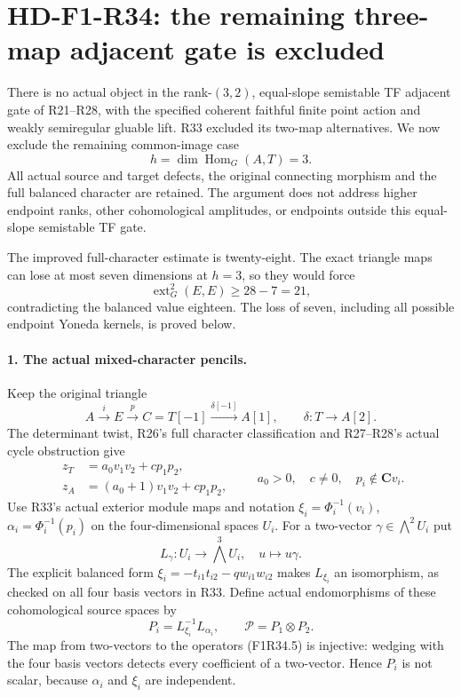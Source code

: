 \section[HD-F1-R34: the rank-three/rank-two gate is excluded]{HD-F1-R34: the remaining three-map adjacent gate is excluded}
\label{sec:followup-rm-three-forward-maps-exclusion}

There is no actual object in the
rank-$(3,2)$, equal-slope semistable TF
adjacent gate of R21--R28, with the
specified coherent faithful finite
point action and weakly semiregular
gluable lift. R33 excluded its
two-map alternatives. We now exclude
the remaining common-image case
\[
                       h=\dim\operatorname{Hom}_G(A,T)=3.
 \tag{F1R34.1}
\]
All actual source and target defects,
the original connecting morphism and
the full balanced character are
retained. The argument does not
address higher endpoint ranks,
other cohomological amplitudes,
or endpoints outside this equal-slope
semistable TF gate.

The improved full-character estimate
is twenty-eight. The exact triangle
maps can lose at most seven
dimensions at $h=3$, so they would
force
\[
                    \operatorname{ext}^2_G(E,E)\ge28-7=21,
 \tag{F1R34.2}
\]
contradicting the balanced value
eighteen. The loss of seven, including
all possible endpoint Yoneda kernels,
is proved below.

\paragraph{1. The actual mixed-character pencils.}
Keep the original triangle
\[
 A\xrightarrow{i}E\xrightarrow{p}C=T[-1]
       \xrightarrow{\delta[-1]}A[1],\qquad
                 \delta:T\longrightarrow A[2].
 \tag{F1R34.3}
\]
The determinant twist, R26's full
character classification and R27--R28's
actual cycle obstruction give
\[
 \begin{split}
 z_T&=a_0v_1v_2+c p_1p_2,\\
 z_A&=(a_0+1)v_1v_2+c p_1p_2,
 \end{split}
 \qquad a_0>0,\quad c\ne0,\quad
                p_i\notin\mathbf C v_i.
 \tag{F1R34.4}
\]
Use R33's actual exterior module
maps and notation
$\xi_i=\Phi_i^{-1}(v_i)$,
$\alpha_i=\Phi_i^{-1}(p_i)$
on the four-dimensional spaces $U_i$.
For a two-vector $\gamma\in\bigwedge^2U_i$
put
\[
 L_\gamma:U_i\longrightarrow\bigwedge^3U_i,
                     \quad u\longmapsto u\gamma.
 \tag{F1R34.5}
\]
The explicit balanced form
$\xi_i=-t_{i1}t_{i2}-q w_{i1}w_{i2}$
makes $L_{\xi_i}$ an isomorphism,
as checked on all four basis vectors
in R33. Define actual endomorphisms
of these cohomological source spaces by
\[
                  P_i=L_{\xi_i}^{-1}L_{\alpha_i},
                       \qquad \mathcal P=P_1\otimes P_2.
 \tag{F1R34.6}
\]
The map from two-vectors to the
operators (F1R34.5) is injective:
wedging with the four basis vectors
detects every coefficient of a
two-vector. Hence $P_i$ is not
scalar, because $\alpha_i$ and
$\xi_i$ are independent.

